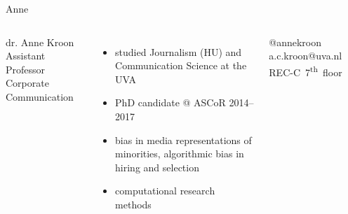 \begin{frame}{Anne}

	\begin{columns}
		dr. Anne Kroon \\
		Assistant Professor Corporate Communication \\
		\begin{itemize}
			\item studied Journalism (HU) and Communication Science at the UVA 
			\item PhD candidate @ ASCoR 2014--2017
			\item bias in media representations of minorities, algorithmic bias in hiring and selection 
			\item computational research methods
		\end{itemize}
		@annekroon ~~ a.c.kroon@uva.nl ~~ REC-C~7\textsuperscript{th}~floor 
	\end{columns}
\end{frame}


